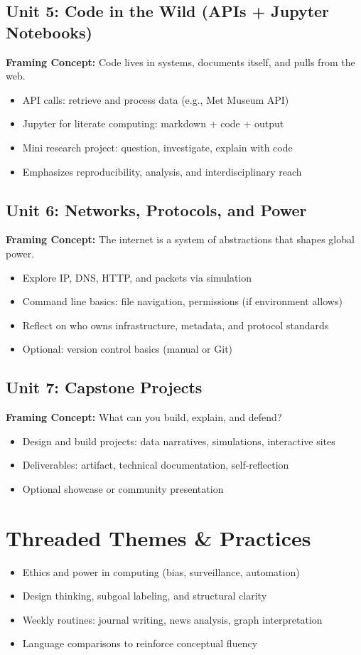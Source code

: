 \documentclass[11pt]{article}
\begin{document}
\subsection*{Unit 5: Code in the Wild (APIs + Jupyter Notebooks)}
\textbf{Framing Concept:} Code lives in systems, documents itself, and pulls from the web.
\begin{itemize}[leftmargin=*]
  \item API calls: retrieve and process data (e.g., Met Museum API)
  \item Jupyter for literate computing: markdown + code + output
  \item Mini research project: question, investigate, explain with code
  \item Emphasizes reproducibility, analysis, and interdisciplinary reach
\end{itemize}

\subsection*{Unit 6: Networks, Protocols, and Power}
\textbf{Framing Concept:} The internet is a system of abstractions that shapes global power.
\begin{itemize}[leftmargin=*]
  \item Explore IP, DNS, HTTP, and packets via simulation
  \item Command line basics: file navigation, permissions (if environment allows)
  \item Reflect on who owns infrastructure, metadata, and protocol standards
  \item Optional: version control basics (manual or Git)
\end{itemize}

\subsection*{Unit 7: Capstone Projects}
\textbf{Framing Concept:} What can you build, explain, and defend?
\begin{itemize}[leftmargin=*]
  \item Design and build projects: data narratives, simulations, interactive sites
  \item Deliverables: artifact, technical documentation, self-reflection
  \item Optional showcase or community presentation
\end{itemize}

\section*{Threaded Themes \& Practices}
\begin{itemize}[leftmargin=*]
  \item Ethics and power in computing (bias, surveillance, automation)
  \item Design thinking, subgoal labeling, and structural clarity
  \item Weekly routines: journal writing, news analysis, graph interpretation
  \item Language comparisons to reinforce conceptual fluency
\end{itemize}
\end{document}
